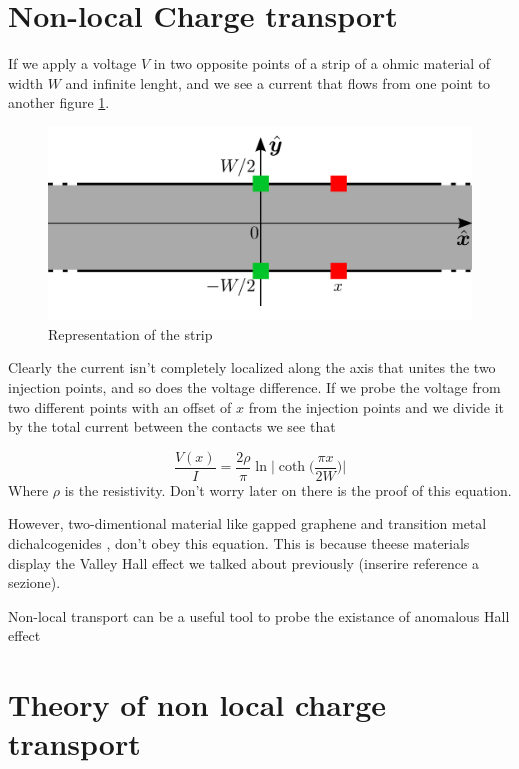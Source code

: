 \section{Non-local Charge transport}
If we apply a voltage $V$ in two opposite points of a strip of a ohmic material of width $W$ and infinite lenght, and  we see a current that flows from one point to another figure \ref{fig:beconcini_strip}.\newline
\begin{figure}
    \centering
    \includegraphics[width=0.7\linewidth]{Immagini/ValleyHall/beconcini_strip.pdf}
    \caption{Representation of the strip}
    \label{fig:beconcini_strip}
\end{figure}
Clearly the current isn't completely localized along the axis that unites the two injection points, and so does the voltage difference.\newline
If we probe the voltage from two different points with an offset of $x$ from the injection points and we divide it by the total current between the contacts we see that  

\begin{equation}
    \frac{V(x)}I=\frac{2\rho}\pi\ln\bigg |\coth \Big(\frac{\pi x}{2W}\Big)\bigg |
\end{equation}
Where $\rho$ is the resistivity. Don't worry later on there is the proof of this equation.\newline

However, two-dimentional material like gapped graphene \cite{gorbachev2014detecting,sui2015gate,shimazaki2015generation} and transition metal dichalcogenides \cite{xiao2012coupled,mak2014valley,lee2017valley}, don't obey this equation. This is because theese materials display the Valley Hall effect we talked about previously (inserire reference a sezione).

Non-local transport can be a useful tool to probe the existance of anomalous Hall effect \cite{valenzuela2006direct,abanin2009nonlocal,brune2010evidence,abanin2011giant,balakrishnan2013g,wang2015proximity}


\section{Theory of non local charge transport}

